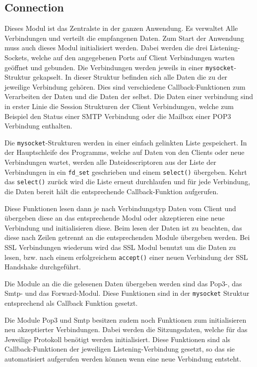 \documentclass[final,a4paper,11pt,notitlepage,halfparskip]{scrreprt}
\begin{document}
\subsection{Connection}
Dieses Modul ist das Zentralste in der ganzen Anwendung. Es verwaltet Alle
Verbindungen und verteilt die empfangenen Daten. Zum Start der Anwendung muss
auch dieses Modul initialisiert werden. Dabei werden die drei Listening-Sockets,
welche auf den angegebenen Ports auf Client Verbindungen warten geöffnet und
gebunden. Die Verbindungen werden jeweils in einer \texttt{mysocket}-Struktur
gekapselt. In dieser Struktur befinden sich alle Daten die zu der jeweilige
Verbindung gehören. Dies sind verschiedene Callback-Funktionen zum Verarbeiten
der Daten und die Daten der selbst. Die Daten einer verbindung sind in erster
Linie die Session Strukturen der Client Verbindungen, welche zum Beispiel den
Status einer SMTP Verbindung oder die Mailbox einer POP3 Verbindung enthalten.

Die \texttt{mysocket}-Strukturen werden in einer einfach gelinkten Liste
gespeichert. In der Hauptschleife des Programms, welche auf Daten von den
Clients oder neue Verbindungen wartet, werden alle Dateidescriptoren aus der
Liste der Verbindungen in ein \texttt{fd\_set} geschrieben und einem
\texttt{select()} übergeben. Kehrt das \texttt{select()} zurück wird die Liste
erneut durchlaufen und für jede Verbindung, die Daten bereit hält die
entsprechende Callback-Funktion aufgerufen.

Diese Funktionen lesen dann je nach Verbindungstyp Daten vom Client und
übergeben diese an das entsprechende Modul oder akzeptieren eine neue Verbindung
und initialisieren diese.
Beim lesen der Daten ist zu beachten, das diese nach Zeilen getrennt an die
entsprechenden Module übergeben werden. Bei SSL Verbindungen wiederum wird das
SSL Modul benutzt um die Daten zu lesen, bzw. nach einem erfolgreichem 
\texttt{accept()} einer neuen Verbindung der SSL Handshake durchgeführt.

Die Module an die die gelesenen Daten übergeben werden sind das Pop3-, das 
Smtp- und das Forward-Modul. Diese Funktionen sind in der \texttt{mysocket}
Struktur entsprechend als Callback Funktion gesetzt.

Die Module Pop3 und Smtp besitzen zudem noch Funktionen zum initialisieren neu
akzeptierter Verbindungen. Dabei werden die Sitzungsdaten, welche für das 
Jeweilige Protokoll benötigt werden initialisiert. Diese Funktionen sind als 
Callback-Funktionen der jeweiligen Listening-Verbindung gesetzt, so das sie 
automatisiert aufgerufen werden können wenn eine neue Verbindung entsteht.
\end{document}
